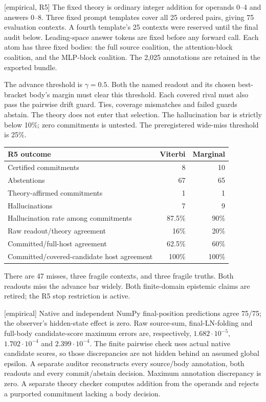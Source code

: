 \documentclass[11pt]{article}
\newcommand{\status}[1]{\textsf{[#1]}}
\begin{document}
\status{empirical, R5} The fixed theory is ordinary integer addition for
operands 0--4 and answers 0--8. Three fixed prompt templates cover all 25
ordered pairs, giving 75 evaluation contexts. A fourth template's 25
contexts were reserved until the final audit below. Leading-space answer tokens
are fixed before any forward call. Each atom has three fixed bodies: the
full source coalition, the attention-block coalition, and the MLP-block
coalition. The 2,025 annotations are retained in the exported bundle.

The advance threshold is $\gamma=0.5$. Both the named readout and its chosen
best-bracket body's margin must clear this threshold. Each covered rival
must also pass the pairwise drift guard. Ties, coverage mismatches and
failed guards abstain. The theory does not enter that selection. The
hallucination bar is strictly below 10\%; zero commitments is untested.
The preregistered wide-miss threshold is 25\%.
\begin{center}
\begin{tabular}{lrr}
\toprule
R5 outcome & Viterbi & Marginal\\
\midrule
Certified commitments & 8 & 10\\
Abstentions & 67 & 65\\
Theory-affirmed commitments & 1 & 1\\
Hallucinations & 7 & 9\\
Hallucination rate among commitments & 87.5\% & 90\%\\
Raw readout/theory agreement & 16\% & 20\%\\
Committed/full-host agreement & 62.5\% & 60\%\\
Committed/covered-candidate host agreement & 100\% & 100\%\\
\bottomrule
\end{tabular}
\end{center}
There are 47 misses, three fragile contexts, and three fragile truths.
Both readouts miss the advance bar widely. Both finite-domain epistemic
claims are retired; the R5 stop restriction is active.

\status{empirical} Native and independent NumPy final-position predictions
agree 75/75; the observer's hidden-state effect is zero. Raw source-sum,
final-LN-folding and full-body candidate-score maximum errors are,
respectively, $1.682\cdot10^{-5}$, $1.702\cdot10^{-4}$ and
$2.399\cdot10^{-4}$. The finite pairwise check uses actual native candidate
scores, so those discrepancies are not hidden behind an assumed global
epsilon. A separate auditor reconstructs every source/body annotation,
both readouts and every commit/abstain decision. Maximum annotation
discrepancy is zero. A separate theory checker computes addition from the
operands and rejects a purported commitment lacking a body decision.
\end{document}

